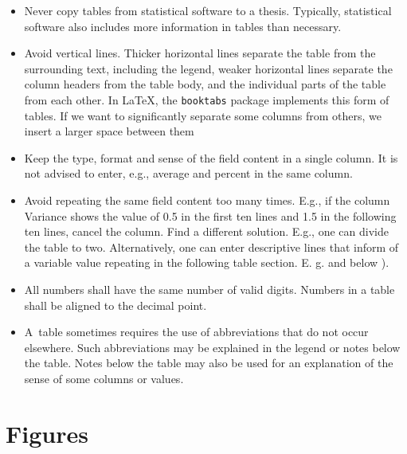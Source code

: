 \begin{itemize} %

\item Never copy tables from statistical software to a thesis. Typically, 
statistical software also includes more information in tables than necessary.

\item Avoid vertical lines. Thicker horizontal lines separate the table from the 
surrounding text, including the legend, weaker horizontal lines separate the 
column headers from the table body, and the individual parts of the table from 
each other. In \LaTeX, the \texttt{booktabs} package implements this form of 
tables. If we want to significantly separate some columns from others, we insert 
a larger space between them

\item Keep the type, format and sense of the field content in a single column. 
It is not advised to enter, e.g., average and percent in the same column.

\item Avoid repeating the same field content too many times. E.g., if the column 
Variance shows the value of 0.5 in the first ten lines and 1.5 in the following 
ten lines, cancel the column. Find a different solution. E.g., one can divide 
the table to two. Alternatively, one can enter descriptive lines that inform of 
a variable value repeating in the following table section. E. g.
\emph{} and below \emph{}).

\item All numbers shall have the same number of valid digits. Numbers in a table 
shall be aligned to the decimal point.

\item A~table sometimes requires the use of abbreviations that do not occur 
elsewhere. Such abbreviations may be explained in the legend or notes below the 
table. Notes below the table may also be used for an explanation of the sense of 
some columns or values.

\end{itemize}


\section{Figures}

